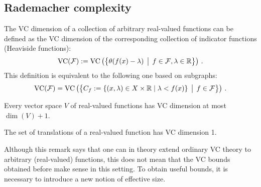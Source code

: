 
\subsection{Rademacher complexity}

    \begin{remark}
        The VC dimension of a collection of arbitrary real-valued functions can be defined as the VC dimension of the corresponding collection of indicator functions (Heaviside functions):
        \begin{gather}
            \mathrm{VC}(\mathcal{F}) := \mathrm{VC}\left(\bigl\{\theta(f(x)-\lambda)\,\bigm\vert\,f\in\mathcal{F},\lambda\in\mathbb{R}\bigr\}\right)\,.
        \end{gather}
        This definition is equivalent to the following one based on subgraphs:
        \begin{gather}
            \mathrm{VC}(\mathcal{F}) = \mathrm{VC}\left(\bigl\{C_f:=\{(x,\lambda)\in X\times\mathbb{R}\mid\lambda<f(x)\}\,\bigm\vert\,f\in\mathcal{F}\bigr\}\right)\,.
        \end{gather}
    \end{remark}

    \begin{example}
        Every vector space $V$ of real-valued functions has VC dimension at most $\dim(V)+1$.
    \end{example}
    \begin{example}[Translations]
        The set of translations of a real-valued function has VC dimension 1.
    \end{example}

    Although this remark says that one can in theory extend ordinary VC theory to arbitrary (real-valued) functions, this does not mean that the VC bounds obtained before make sense in this setting. To obtain useful bounds, it is necessary to introduce a new notion of effective size.

